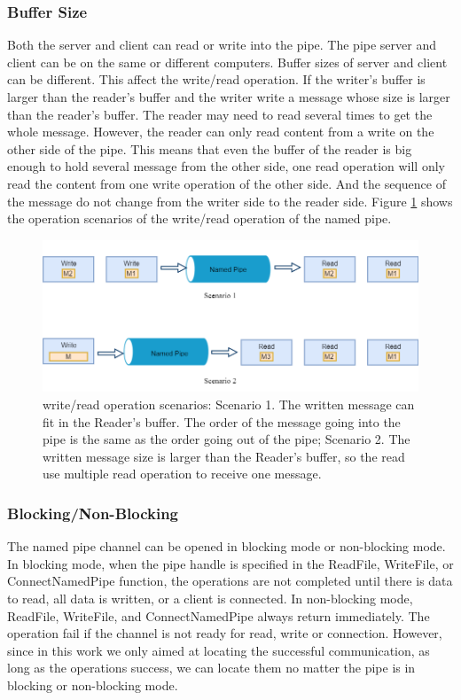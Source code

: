 \subsubsection{Buffer Size}
Both the server and client can read or write into the pipe. The pipe server and client can be on the same or different computers. Buffer sizes of server and client can be different. This affect the write/read operation. If the writer's buffer is larger than the reader's buffer and the writer write a message whose size is larger than the reader's buffer. The reader may need to read several times to get the whole message. However, the reader can only read content from a write on the other side of the pipe. This means that even the buffer of the reader is big enough to hold several message from the other side, one read operation will only read the content from one write operation of the other side. And the sequence of the message do not change from the writer side to the reader side. Figure \ref{event} shows the operation scenarios of the write/read operation of the named pipe.

\begin{figure}[h]
\includegraphics[scale=.48]{Figures/event}
 \caption{write/read operation scenarios: Scenario 1. The written message can fit in the Reader's buffer. The order of the message going into the pipe is the same as the order going out of the pipe; Scenario 2. The written message size is larger than the Reader's buffer, so the read use multiple read operation to receive one message.}
\label{event}
\end{figure}

\subsubsection{Blocking/Non-Blocking}
The named pipe channel can be opened in blocking mode or non-blocking mode. In blocking mode, when the pipe handle is specified in the ReadFile, WriteFile, or ConnectNamedPipe function, the operations are not completed until there is data to read, all data is written, or a client is connected. In non-blocking mode, ReadFile, WriteFile, and ConnectNamedPipe always return immediately. The operation fail if the channel is not ready for read, write or connection. However, since in this work we only aimed at locating the successful communication, as long as the operations success, we can locate them no matter the pipe is in blocking or non-blocking mode.

